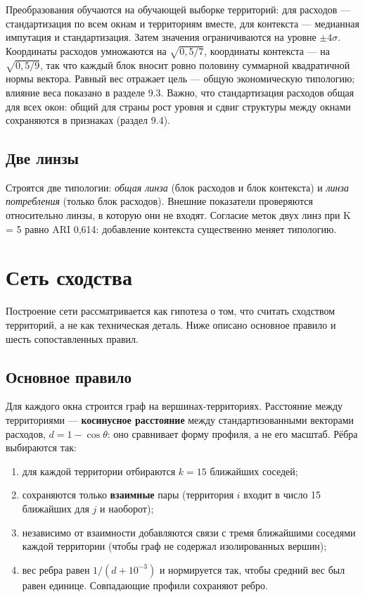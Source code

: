 \documentclass[11pt,a4paper]{article}
\providecommand{\tightlist}{\setlength{\itemsep}{1pt}\setlength{\parskip}{0pt}}
\begin{document}
Преобразования обучаются на обучающей выборке территорий: для расходов --- стандартизация по всем окнам и территориям вместе, для контекста --- медианная импутация и стандартизация. Затем значения ограничиваются на уровне \(\pm 4\sigma\). Координаты расходов умножаются на \(\sqrt{0{,}5/7}\), координаты контекста --- на \(\sqrt{0{,}5/9}\), так что каждый блок вносит ровно половину суммарной квадратичной нормы вектора. Равный вес отражает цель --- общую экономическую типологию; влияние веса показано в разделе 9.3. Важно, что стандартизация расходов общая для всех окон: общий для страны рост уровня и сдвиг структуры между окнами сохраняются в признаках (раздел 9.4).

\subsection{Две линзы}\label{ux434ux432ux435-ux43bux438ux43dux437ux44b}

Строятся две типологии: \emph{общая линза} (блок расходов и блок контекста) и \emph{линза потребления} (только блок расходов). Внешние показатели проверяются относительно линзы, в которую они не входят. Согласие меток двух линз при K = 5 равно ARI 0,614: добавление контекста существенно меняет типологию.

\section{Сеть сходства}\label{ux441ux435ux442ux44c-ux441ux445ux43eux434ux441ux442ux432ux430}

Построение сети рассматривается как гипотеза о том, что считать сходством территорий, а не как техническая деталь. Ниже описано основное правило и шесть сопоставленных правил.

\subsection{Основное правило}\label{ux43eux441ux43dux43eux432ux43dux43eux435-ux43fux440ux430ux432ux438ux43bux43e}

Для каждого окна строится граф на вершинах-территориях. Расстояние между территориями --- \textbf{косинусное расстояние} между стандартизованными векторами расходов, \(d = 1 - \cos\theta\): оно сравнивает форму профиля, а не его масштаб. Рёбра выбираются так:

\begin{enumerate}
\def\labelenumi{\arabic{enumi}.}
\tightlist
\item
  для каждой территории отбираются \(k = 15\) ближайших соседей;
\item
  сохраняются только \textbf{взаимные} пары (территория \(i\) входит в число 15 ближайших для \(j\) и наоборот);
\item
  независимо от взаимности добавляются связи с тремя ближайшими соседями каждой территории (чтобы граф не содержал изолированных вершин);
\item
  вес ребра равен \(1/(d + 10^{-3})\) и нормируется так, чтобы средний вес был равен единице. Совпадающие профили сохраняют ребро.
\end{enumerate}
\end{document}
